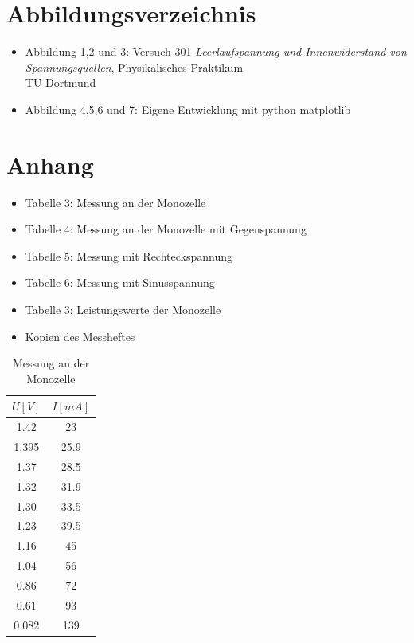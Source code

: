 \documentclass[11pt,ngerman,a4paper]{article}
\begin{document}
 \newpage
\section{Abbildungsverzeichnis}
\begin{itemize}
\item Abbildung 1,2 und 3: Versuch 301 \textit{Leerlaufspannung und Innenwiderstand von Spannungsquellen}, Physikalisches Praktikum\\ TU Dortmund
\item Abbildung 4,5,6 und 7: Eigene Entwicklung mit python matplotlib
\end{itemize}
\section{Anhang}
\begin{itemize}
\item Tabelle 3: Messung an der Monozelle
\item Tabelle 4: Messung an der Monozelle mit Gegenspannung
\item Tabelle 5: Messung mit Rechteckspannung
\item Tabelle 6: Messung mit Sinusspannung
\item Tabelle 3: Leistungswerte der Monozelle
\item Kopien des Messheftes
\end{itemize}
\begin{table}[h]
 \centering

 \begin{tabular}{|c|c|}
  \hline
  $U[V]$ & $I[mA]$  \\
  \hline
  1.42 & 23 \\
  1.395 & 25.9 \\
  1.37& 28.5 \\
  1.32 & 31.9 \\
  1.30 & 33.5\\
  1.23 & 39.5\\
  1.16 & 45 \\
  1.04 & 56\\
  0.86 & 72\\
  0.61 & 93\\
  0.082 & 139\\
  \hline
 \end{tabular}
  \caption{Messung an der Monozelle}
 \label{Messung 1}
 \end{table}
 
\end{document}
